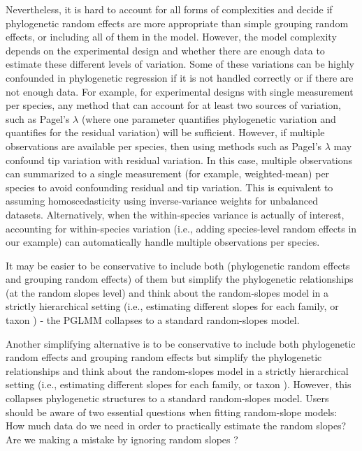 \documentclass[12pt]{article}
\begin{document}
Nevertheless, it is hard to account for all forms of complexities and decide if phylogenetic random effects are more appropriate than simple grouping random effects, or including all of them in the model.
However, the model complexity depends on the experimental design and whether there are enough data to estimate these different levels of variation.
Some of these variations can be highly confounded in phylogenetic regression if it is not handled correctly or if there are not enough data.
For example, for experimental designs with single measurement per species, any method that can account for at least two sources of variation, such as Pagel's $\lambda$ (where one parameter quantifies phylogenetic variation and quantifies for the residual variation) will be sufficient. 
However, if multiple observations are available per species, then using methods such as Pagel's $\lambda$ may confound tip variation with residual variation.
In this case, multiple observations can summarized to a single measurement (for example, weighted-mean) per species to avoid confounding residual and tip variation.
This is equivalent to assuming homoscedasticity using inverse-variance weights for unbalanced datasets. 
Alternatively, when the within-species variance is actually of interest, accounting for within-species variation (i.e., adding species-level random effects in our example) can automatically handle multiple observations per species.

It may be easier to be conservative to include both (phylogenetic random effects and grouping random effects) of them but simplify the phylogenetic relationships (at the random slopes level) and think about the random-slopes model in a strictly hierarchical setting (i.e., estimating different slopes for each family, or taxon \citep{bunnefeld2012island}) - the PGLMM collapses to a standard random-slopes model. 

Another simplifying alternative is to be conservative to include both phylogenetic random effects and grouping random effects but simplify the phylogenetic relationships and think about the random-slopes model in a strictly hierarchical setting (i.e., estimating different slopes for each family, or taxon \citep{bunnefeld2012island}). 
However, this collapses phylogenetic structures to a standard random-slopes model. 
Users should be aware of two essential questions when fitting random-slope models: How much data do we need in order to practically estimate the random slopes? Are we making a mistake by ignoring random slopes \citep{schielzeth2008conclusions}? 
\end{document}
